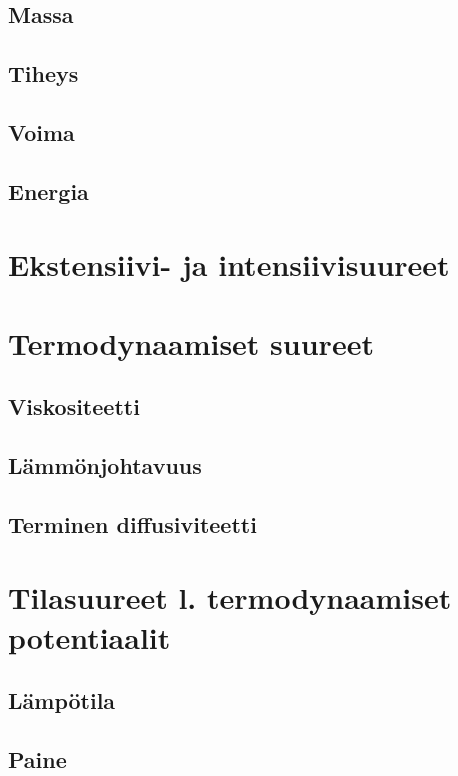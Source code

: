\documentclass[12pt,a4paper,finnish]{book}
\begin{document}
\subsection{Massa}

\subsection{Tiheys}

\subsection{Voima}

\subsection{Energia}

\section{Ekstensiivi- ja intensiivisuureet}

\section{Termodynaamiset suureet}

\subsection{Viskositeetti}

\subsection{Lämmönjohtavuus}

\subsection{Terminen diffusiviteetti}

\section{Tilasuureet l. termodynaamiset potentiaalit} 

\subsection{Lämpötila}

\subsection{Paine}
\end{document}
